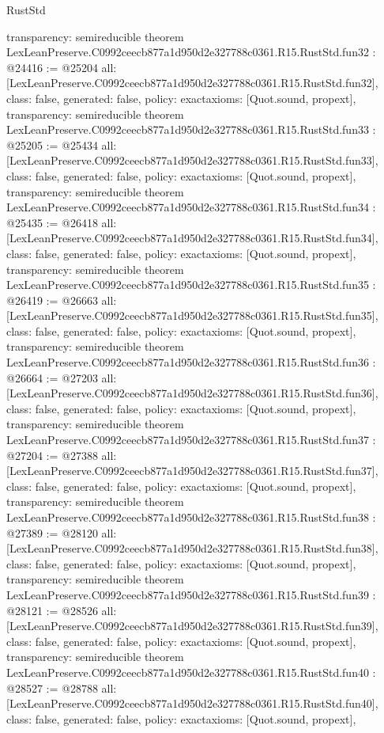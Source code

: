 \begin{lexlean}{RustStd}
\begin{coremodule}
{  transparency: semireducible
}
theorem LexLeanPreserve.C0992ceecb877a1d950d2e327788c0361.R15.RustStd.fun32 : @24416 := @25204 {
  all: [LexLeanPreserve.C0992ceecb877a1d950d2e327788c0361.R15.RustStd.fun32],
  class: false,
  generated: false,
  policy: exact{axioms: [Quot.sound, propext]},
  transparency: semireducible
}
theorem LexLeanPreserve.C0992ceecb877a1d950d2e327788c0361.R15.RustStd.fun33 : @25205 := @25434 {
  all: [LexLeanPreserve.C0992ceecb877a1d950d2e327788c0361.R15.RustStd.fun33],
  class: false,
  generated: false,
  policy: exact{axioms: [Quot.sound, propext]},
  transparency: semireducible
}
theorem LexLeanPreserve.C0992ceecb877a1d950d2e327788c0361.R15.RustStd.fun34 : @25435 := @26418 {
  all: [LexLeanPreserve.C0992ceecb877a1d950d2e327788c0361.R15.RustStd.fun34],
  class: false,
  generated: false,
  policy: exact{axioms: [Quot.sound, propext]},
  transparency: semireducible
}
theorem LexLeanPreserve.C0992ceecb877a1d950d2e327788c0361.R15.RustStd.fun35 : @26419 := @26663 {
  all: [LexLeanPreserve.C0992ceecb877a1d950d2e327788c0361.R15.RustStd.fun35],
  class: false,
  generated: false,
  policy: exact{axioms: [Quot.sound, propext]},
  transparency: semireducible
}
theorem LexLeanPreserve.C0992ceecb877a1d950d2e327788c0361.R15.RustStd.fun36 : @26664 := @27203 {
  all: [LexLeanPreserve.C0992ceecb877a1d950d2e327788c0361.R15.RustStd.fun36],
  class: false,
  generated: false,
  policy: exact{axioms: [Quot.sound, propext]},
  transparency: semireducible
}
theorem LexLeanPreserve.C0992ceecb877a1d950d2e327788c0361.R15.RustStd.fun37 : @27204 := @27388 {
  all: [LexLeanPreserve.C0992ceecb877a1d950d2e327788c0361.R15.RustStd.fun37],
  class: false,
  generated: false,
  policy: exact{axioms: [Quot.sound, propext]},
  transparency: semireducible
}
theorem LexLeanPreserve.C0992ceecb877a1d950d2e327788c0361.R15.RustStd.fun38 : @27389 := @28120 {
  all: [LexLeanPreserve.C0992ceecb877a1d950d2e327788c0361.R15.RustStd.fun38],
  class: false,
  generated: false,
  policy: exact{axioms: [Quot.sound, propext]},
  transparency: semireducible
}
theorem LexLeanPreserve.C0992ceecb877a1d950d2e327788c0361.R15.RustStd.fun39 : @28121 := @28526 {
  all: [LexLeanPreserve.C0992ceecb877a1d950d2e327788c0361.R15.RustStd.fun39],
  class: false,
  generated: false,
  policy: exact{axioms: [Quot.sound, propext]},
  transparency: semireducible
}
theorem LexLeanPreserve.C0992ceecb877a1d950d2e327788c0361.R15.RustStd.fun40 : @28527 := @28788 {
  all: [LexLeanPreserve.C0992ceecb877a1d950d2e327788c0361.R15.RustStd.fun40],
  class: false,
  generated: false,
  policy: exact{axioms: [Quot.sound, propext]},
}
\end{coremodule}
\end{lexlean}
